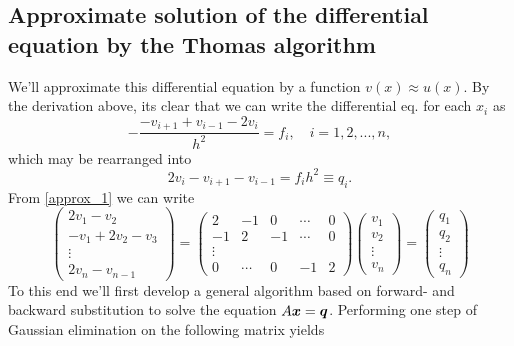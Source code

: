 \documentclass[english,notitlepage]{revtex4-1}  %
\begin{document}
\subsection{Approximate solution of the differential equation by the Thomas algorithm}
We'll approximate this differential equation by a function $v(x) \approx u(x)$. By the derivation above, its clear that we can write the differential eq. for each $x_i$ as 
\begin{equation}
	-\frac{-v_{i+1}+v_{i-1} - 2v_i}{h^2} = f_i, \quad i=1,2,...,n,
\end{equation}
which may be rearranged into 
\begin{equation}\label{approx_1}
	2v_i - v_{i+1} - v_{i-1} = f_ih^2 \equiv q_i.
\end{equation}
From \eqref{approx_1} we can write 
\begin{equation}
	\begin{pmatrix}
	2v_1 - v_2 \\ 
	-v_1 + 2v_2 - v_3 \\ 
	\vdots \\
	2v_n - v_{n-1}
	\end{pmatrix}
	=
	\begin{pmatrix}
	2 & -1 & 0  & \cdots & 0 \\
	-1 & 2 & -1 & \cdots & 0 \\
	\vdots \\
	0 & \cdots & 0 & -1 & 2 
	\end{pmatrix}
	\begin{pmatrix}
	v_1 \\ v_2 \\ \vdots \\ v_n
	\end{pmatrix}
	= \begin{pmatrix}
	q_1 \\ q_2 \\ \vdots \\ q_n
	\end{pmatrix}
\end{equation}
To this end we'll first develop a general algorithm based on forward- and backward substitution to solve the equation $A\vb*{x} = \vb*{q}$. 
Performing one step of Gaussian elimination on the following matrix yields 
\end{document}
